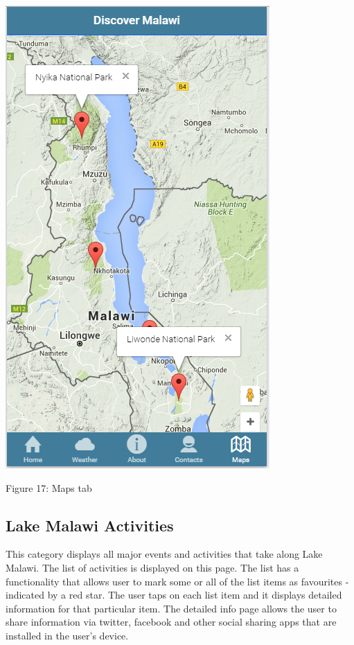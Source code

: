 \begin{center}    
	\includegraphics{img/maps.png}
\end{center}
\begin{center}
	Figure 17: Maps tab 
\end{center}
\paragraph{}

\subsection{Lake Malawi Activities}
This category displays all major events and activities that take along Lake Malawi. The list of activities is displayed on this page. The list has a functionality that allows user to mark some or all of the list items as favourites - indicated by a red star. The user taps on each list item and it displays detailed information for that particular item. The detailed info page allows the user to share information via twitter, facebook and other social sharing apps that are installed in the user’s device.

